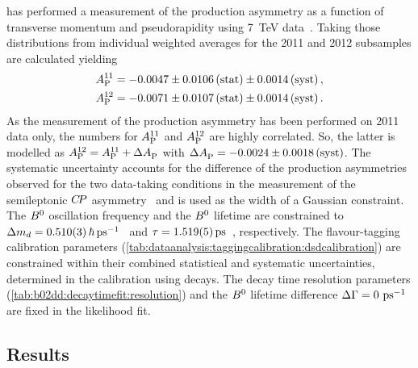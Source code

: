 \lhcb has performed a measurement of the production asymmetry as a function
of transverse momentum and pseudorapidity using \SI{7}{\TeV}
data~\cite{LHCb-PAPER-2014-042}. Taking those distributions from \BdToDD
individual weighted averages for the 2011 and 2012 subsamples are calculated
yielding
%
\begin{equation}
  \begin{split}
    A_\text{P}^{11} &= -0.0047 \pm 0.0106 \,\text{(stat)} \pm 0.0014 \, \text{(syst)} \,, \\
    A_\text{P}^{12} &= -0.0071 \pm 0.0107 \,\text{(stat)} \pm 0.0014 \, \text{(syst)} \,.
  \end{split}
\end{equation}
%
As the measurement of the production asymmetry has been performed on 2011 data
only, the numbers for $A_\text{P}^{11}$ and $A_\text{P}^{12}$ are highly
correlated. So, the latter is modelled as $A_\text{P}^{12} = A_\text{P}^{11} +
\Delta A_\text{P}^{}$ with $\Delta A_\text{P}^{} = -0.0024 \pm 0.0018
\,\text{(syst)}$. The systematic uncertainty accounts for the difference of
the production asymmetries observed for the two data-taking conditions in the
measurement of the semileptonic ${C\!P}$ asymmetry~\cite{LHCb-PAPER-2014-053} and
is used as the width of a Gaussian constraint. The ${{B}^0}$ oscillation frequency and
the ${{B}^0}$ lifetime are constrained to $\dmd =
\SI{0.510\pm0.003}{\planckbar\invps}$~\cite{PDG2014} and $\tau =
\SI{1.519\pm0.005}{\ps}$~\cite{PDG2014}, respectively. The
flavour-tagging calibration parameters
(\cref{tab:dataanalysis:taggingcalibration:dsdcalibration}) are constrained
within their combined statistical and systematic uncertainties, determined in
the calibration using \BdToDsD decays. The decay time resolution parameters
(\cref{tab:b02dd:decaytimefit:resolution}) and the ${{B}^0}$ lifetime difference
${\Delta\Gamma} = \SI{0}{\ensuremath{{\mathrm{ \,ps^{-1}}}}}$ are fixed in the likelihood fit.

\subsection{Results}

